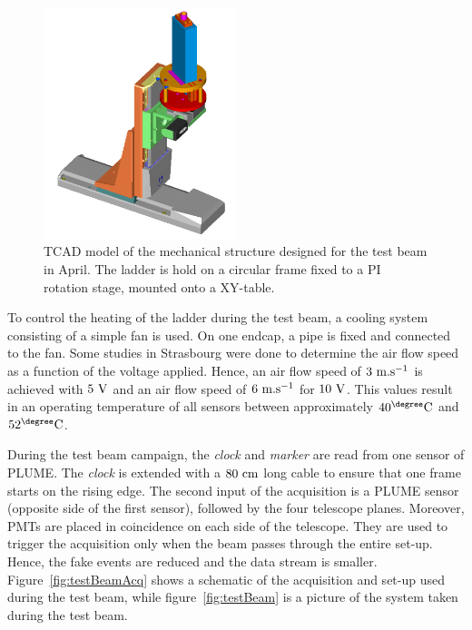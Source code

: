       \begin{figure}[!b]
        \centering
        \includegraphics[width = 0.5\textwidth]{Pictures/X0/Frame/Testbeam1.PNG}
        \caption{TCAD model of the mechanical structure designed for the test beam in April. The ladder is hold on a circular frame fixed to a PI rotation stage, mounted onto a XY-table.}
        \label{fig:mechanics}
      \end{figure}

      To control the heating of the ladder during the test beam, a cooling system consisting of a simple fan is used.
      On one endcap, a pipe is fixed and connected to the fan.
      Some studies in Strasbourg were done to determine the air flow speed as a function of the voltage applied.
      Hence, an air flow speed of $3~\rm{m.s^{-1}}$ is achieved with $5~\rm{V}$ and an air flow speed of $6~\rm{m.s^{-1}}$ for $10~\rm{V}$.
      This values result in an operating temperature of all sensors between approximately $40^{\degree}\rm{C}$ and $52^{\degree}\rm{C}$.

      During the test beam campaign, the \textit{clock} and \textit{marker} are read from one sensor of \gls{PLUME}.
      The \textit{clock} is extended with a $80~\rm{cm}$ long cable to ensure that one frame starts on the rising edge.
      The second input of the acquisition is a \gls{PLUME} sensor (opposite side of the first sensor), followed by the four telescope planes. 
      Moreover, \gls{PMT}s are placed in coincidence on each side of the telescope.
      They are used to trigger the acquisition only when the beam passes through the entire set-up.
      Hence, the fake events are reduced and the data stream is smaller.
      Figure~\ref{fig:testBeamAcq} shows a schematic of the acquisition and set-up used during the test beam, while figure~\ref{fig:testBeam} is a picture of the system taken during the test beam.

